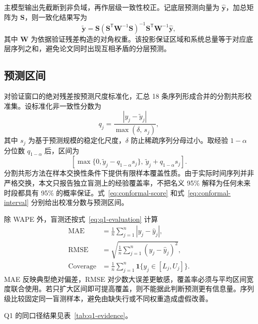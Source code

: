 主模型输出先截断到非负域，再作层级一致性校正。记底层预测向量为 $\hat{\boldsymbol y}$，加总矩阵为 $\boldsymbol S$，则一致化结果写为
\begin{equation}
  \tilde{\boldsymbol y}=\boldsymbol S
  \left(\boldsymbol S^{\mathsf T}\boldsymbol W^{-1}\boldsymbol S\right)^{-1}
  \boldsymbol S^{\mathsf T}\boldsymbol W^{-1}\hat{\boldsymbol y},
  \label{eq:reconciliation}
\end{equation}
其中 $\boldsymbol W$ 为依据验证残差构造的对角权重。该投影保证区域和系统总量等于对应底层序列之和，避免论文同时出现互相矛盾的分层预测。

\subsection{预测区间}

对验证窗口的绝对残差按预测尺度标准化，汇总 18 条序列形成合并的分割共形校准集。设标准化非一致性分数为
\begin{equation}
  q_j=\frac{|y_j-\tilde y_j|}{\max(\delta,\,s_j)},
  \label{eq:conformal-score}
\end{equation}
其中 $s_j$ 为基于预测规模的稳定化尺度，$\delta$ 防止稀疏序列分母过小。取经验 $1-\alpha$ 分位数 $q_{1-\alpha}$ 后，区间为
\begin{equation}
  \left[\max\{0,\tilde y_j-q_{1-\alpha}s_j\},\ \tilde y_j+q_{1-\alpha}s_j\right].
  \label{eq:conformal-interval}
\end{equation}
分割共形方法在样本交换性条件下提供有限样本覆盖性质。由于实际时间序列并非严格交换，本文只报告独立盲测上的经验覆盖率，不把名义 95\% 解释为任何未来时段都具有 95\% 的概率保证。式~\eqref{eq:conformal-score} 和式~\eqref{eq:conformal-interval} 分别给出校准分数与预测区间。

除 WAPE 外，盲测还按式~\eqref{eq:q1-evaluation} 计算
\begin{align}
  \mathrm{MAE}&=\frac{1}{n}\sum_{j=1}^{n}|y_j-\hat y_j|,\\
  \mathrm{RMSE}&=\sqrt{\frac{1}{n}\sum_{j=1}^{n}(y_j-\hat y_j)^2},\\
  \mathrm{Coverage}&=\frac{1}{n}\sum_{j=1}^{n}\mathbf{1}\{y_j\in[L_j,U_j]\}.
  \label{eq:q1-evaluation}
\end{align}
MAE 反映典型绝对偏差，RMSE 对少数大误差更敏感，覆盖率必须与平均区间宽度联合使用。若只扩大区间即可提高覆盖，则不能据此判断预测更有信息量。序列级比较固定同一盲测样本，避免由缺失行或不同权重造成虚假改善。

Q1 的同口径结果见表~\ref{tab:q1-evidence}。

